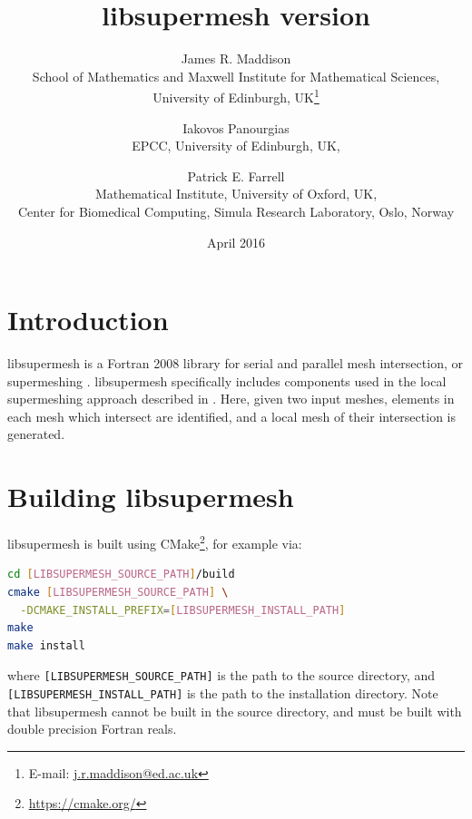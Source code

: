 \documentclass{article}
\begin{document}
\title{libsupermesh version \version}
\date{April 2016}
\author{James R. Maddison \\ School of Mathematics and Maxwell Institute for Mathematical Sciences, \\ University of Edinburgh, UK\footnote{E-mail: \href{mailto:j.r.maddison@ed.ac.uk}{j.r.maddison@ed.ac.uk}} \\
   \and Iakovos Panourgias \\ EPCC, University of Edinburgh, UK, \\
   \and Patrick E. Farrell \\ Mathematical Institute, University of Oxford, UK, \\ Center for Biomedical Computing, Simula Research Laboratory, Oslo, Norway}

\maketitle

\tableofcontents

\section{Introduction}

libsupermesh is a Fortran 2008 library for serial and parallel mesh
intersection, or supermeshing \citep{farrell2009,farrell2009a}. libsupermesh
specifically includes components used in the local supermeshing approach
described in \citet{farrell2011} \citep[see also][]{gander2009,gander2013}.
Here, given two input meshes, elements in each mesh which intersect are
identified, and a local mesh of their intersection is generated.

\section{Building libsupermesh}

libsupermesh is built using CMake\footnote{\url{https://cmake.org/}}, for
example via:
\begin{lstlisting}[language=sh,frame=single]
cd [LIBSUPERMESH_SOURCE_PATH]/build
cmake [LIBSUPERMESH_SOURCE_PATH] \
  -DCMAKE_INSTALL_PREFIX=[LIBSUPERMESH_INSTALL_PATH]
make
make install
\end{lstlisting}
where \verb+[LIBSUPERMESH_SOURCE_PATH]+ is the path to the source directory, and
\linebreak \verb+[LIBSUPERMESH_INSTALL_PATH]+ is the path to the installation
directory. Note that libsupermesh cannot be built in the source directory, and
must be built with double precision Fortran reals.
\end{document}
